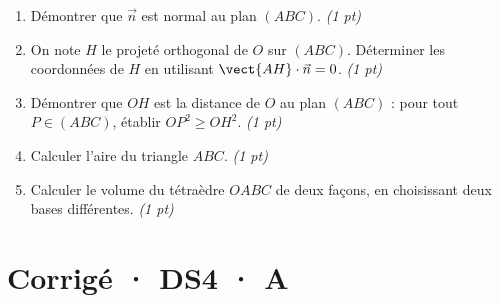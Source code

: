 \begin{enumerate}

\item Démontrer que $\vec n$ est normal au plan $(ABC)$. \hfill\textit{(1 pt)}

\item On note $H$ le projeté orthogonal de $O$ sur $(ABC)$. Déterminer les coordonnées de $H$ en utilisant $\vect{AH}\cdot\vec n=0$. \hfill\textit{(1 pt)}

\item Démontrer que $OH$ est la distance de $O$ au plan $(ABC)$ : pour tout $P\in(ABC)$, établir $OP^2\ge OH^2$. \hfill\textit{(1 pt)}

\item Calculer l'aire du triangle $ABC$. \hfill\textit{(1 pt)}

\item Calculer le volume du tétraèdre $OABC$ de deux façons, en choisissant deux bases différentes. \hfill\textit{(1 pt)}

\end{enumerate}

\ifprof\clearpage

\section*{Corrigé · DS4 · A}\label{cor:6-3}

